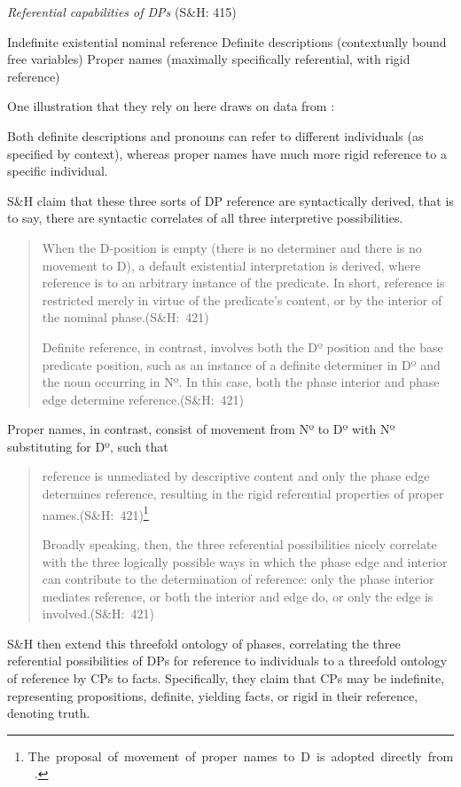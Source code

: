 \documentclass[output=paper
,modfonts
,nonflat
]{langsci/langscibook}
\begin{document}
\ea \textit{Referential capabilities of DPs} (S\&H: 415)
\begin{xlist}
\ex Indefinite existential nominal reference 
\ex Definite descriptions (contextually bound free variables)
\ex Proper names (maximally specifically referential, with rigid reference)
\end{xlist}
\z
\noindent One illustration that they rely on here draws on data from \citet{Elbourne:2008}: 

\ea
\begin{xlist}
\end{xlist}
\z
\noindent Both definite descriptions and pronouns can refer to different individuals (as specified by context), whereas proper names have much more rigid reference to a specific individual. 

S\&H claim that these three sorts of DP reference are syntactically derived, that is to say, there are syntactic correlates of all three interpretive possibilities. 

\begin{quote}
When the D-position is empty (there is no determiner and there is no movement to D), a default existential interpretation is derived, where reference is to an arbitrary instance of the predicate. In short, reference is restricted merely in virtue of the predicate’s content, or by the interior of the nominal phase.\hbox{}\hfill\hbox{(S\&H: 421)}

Definite reference, in contrast, involves both the Dº position and the base predicate position, such as an instance of a definite determiner in Dº and the noun occurring in Nº. In this case, both the phase interior and phase edge determine reference.\hbox{}\hfill\hbox{(S\&H: 421)}
\end{quote}
\noindent Proper names, in contrast, consist of movement from Nº to Dº with Nº substituting for Dº, such that 


\begin{quote}
reference is unmediated by descriptive content and only the phase edge determines reference, resulting in the rigid referential properties of proper names.\hbox{}\hfill\hbox{(S\&H: 421)\footnote{The proposal of movement of proper names to D is adopted directly from \citet{Longobardi:1994,Longobardi:2005}.}}  

Broadly speaking, then, the three referential possibilities nicely correlate with the three logically possible ways in which the phase edge and interior can contribute to the determination of reference: only the phase interior mediates reference, or both the interior and edge do, or only the edge is involved.\hbox{}\hfill\hbox{(S\&H: 421)}
\end{quote}
\noindent S\&H then extend this threefold ontology of phases, correlating the three referential possibilities of DPs for reference to individuals to a threefold ontology of reference by CPs to facts. Specifically, they claim that CPs may be indefinite, representing propositions, definite, yielding facts, or rigid in their reference, denoting truth. 
\end{document}
